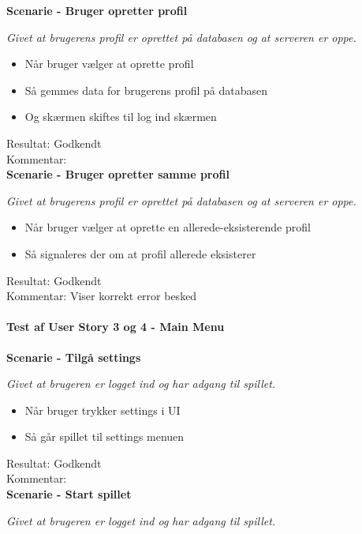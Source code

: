 \textbf{Scenarie - Bruger opretter profil}

\textit{Givet at brugerens profil er oprettet på databasen og at serveren er oppe.}

\begin{itemize}
  \item Når bruger vælger at oprette profil
  \item Så gemmes data for brugerens profil på databasen
  \item Og skærmen skiftes til log ind skærmen
\end{itemize}

Resultat: Godkendt\\
Kommentar:\\

\textbf{Scenarie - Bruger opretter samme profil}

\textit{Givet at brugerens profil er oprettet på databasen og at serveren er oppe.}

\begin{itemize}
  \item Når bruger vælger at oprette en allerede-eksisterende profil
  \item Så signaleres der om at profil allerede eksisterer
\end{itemize}

Resultat: Godkendt\\
Kommentar: Viser korrekt error besked\\

\paragraph{Test af User Story 3 og 4 - Main Menu}

\textbf{Scenarie - Tilgå settings}

\textit{Givet at brugeren er logget ind og har adgang til spillet.}

\begin{itemize}
  \item Når bruger trykker settings i UI
  \item Så går spillet til settings menuen
\end{itemize}

Resultat: Godkendt\\
Kommentar:\\

\textbf{Scenarie - Start spillet}

\textit{Givet at brugeren er logget ind og har adgang til spillet.}

